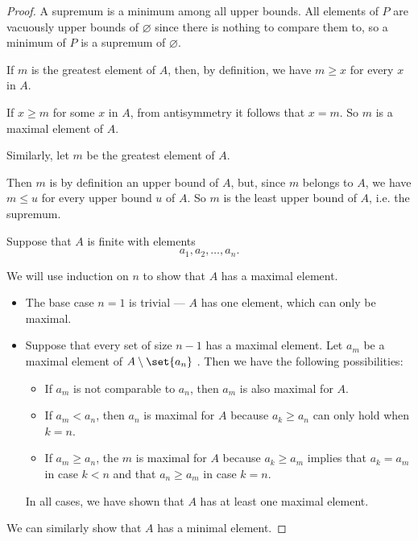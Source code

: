 \begin{proof}
   A supremum is a minimum among all upper bounds. All elements of \( P \) are vacuously upper bounds of \( \varnothing \) since there is nothing to compare them to, so a minimum of \( P \) is a supremum of \( \varnothing \).

   If \( m \) is the greatest element of \( A \), then, by definition, we have \( m \geq x \) for every \( x \) in \( A \).

  If \( x \geq m \) for some \( x \) in \( A \), from antisymmetry it follows that \( x = m \). So \( m \) is a maximal element of \( A \).

   Similarly, let \( m \) be the greatest element of \( A \).

  Then \( m \) is by definition an upper bound of \( A \), but, since \( m \) belongs to \( A \), we have \( m \leq u \) for every upper bound \( u \) of \( A \). So \( m \) is the least upper bound of \( A \), i.e. the supremum.

   Suppose that \( A \) is finite with elements
  \begin{equation*}
    a_1, a_2, \ldots, a_n.
  \end{equation*}

  We will use induction on \( n \) to show that \( A \) has a maximal element.
  \begin{itemize}
    \item The base case \( n = 1 \) is trivial --- \( A \) has one element, which can only be maximal.

    \item Suppose that every set of size \( n - 1 \) has a maximal element. Let \( a_m \) be a maximal element of \( A \setminus \set{ a_n } \) . Then we have the following possibilities:
    \begin{itemize}
      \item If \( a_m \) is not comparable to \( a_n \), then \( a_m \) is also maximal for \( A \).

      \item If \( a_m < a_n \), then \( a_n \) is maximal for \( A \) because \( a_k \geq a_n \) can only hold when \( k = n \).

      \item If \( a_m \geq a_n \), the \( m \) is maximal for \( A \) because \( a_k \geq a_m \) implies that \( a_k = a_m \) in case \( k < n \) and that \( a_n \geq a_m \) in case \( k = n \).
    \end{itemize}

    In all cases, we have shown that \( A \) has at least one maximal element.
  \end{itemize}

  We can similarly show that \( A \) has a minimal element.
\end{proof}

